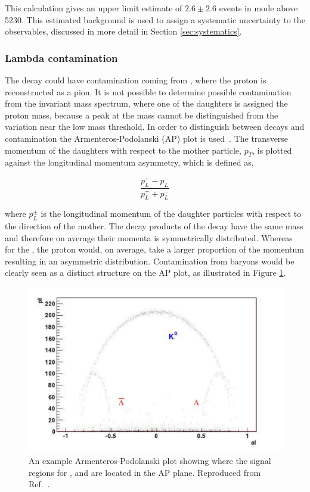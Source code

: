 This calculation gives an upper limit estimate of $2.6 \pm 2.6$  events in \pik mode above 5230\mev. This estimated \Bs background is used to assign a systematic uncertainty to the \CP observables, discussed in more detail in Section \ref{sec:systematics}.


\subsubsection{Lambda contamination}
\label{sec:backgrounds:contamination}

The \decay{\KS}{\pip\pim} decay could have contamination coming from \decay{\Lz}{\proton\pim}, where the proton is reconstructed as a pion. It is not possible to determine possible \Lz contamination from the \KS invariant mass spectrum, where one of the \KS daughters is assigned the proton mass, because a peak at the \Lz mass cannot be distinguished from the variation near the low mass threshold. In order to distinguish between \KS decays and \Lz contamination the Armenteros-Podolanski (AP) plot is used~\cite{APplot}. The transverse momentum of the daughters with respect to the mother particle, $p_T$, is plotted against the longitudinal momentum asymmetry, which is defined as,

\begin{equation}
\frac{p_L^+ - p_L^-}{p_L^+ + p_L^-}
\label{longitudinalpasy}
\end{equation}

where $p_L^{\pm}$ is the longitudinal momentum of the daughter particles with respect to the direction of the mother. The decay products of the \decay{\KS}{\pip\pim} decay have the same mass and therefore on average their momenta is symmetrically distributed. Whereas for the \decay{\Lz}{\proton\pim}, the proton would, on average, take a larger proportion of the momentum resulting in an asymmetric distribution. Contamination from \Lz baryons would be clearly seen as a distinct structure on the AP plot, as illustrated in Figure \ref{apexample}. 

\begin{figure}
\centering
\includegraphics[width=0.5\linewidth]{figures/backgrounds/APfromPaper.pdf}
\caption{An example Armenteros-Podolanski plot showing where the signal regions for \KS, \Lz and \Lbar are located in the AP plane. Reproduced from Ref.~\cite{APplot}.}
\label{apexample}
\end{figure}


